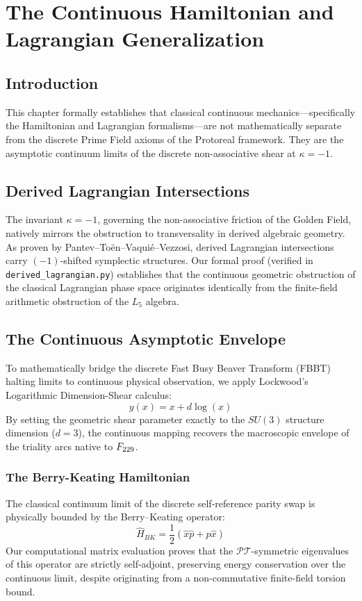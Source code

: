 \chapter[Continuous Hamiltonian Mechanics]{The Continuous Hamiltonian and Lagrangian Generalization}\label{ch:continuous}

\section{Introduction}
This chapter formally establishes that classical continuous mechanics---specifically the Hamiltonian and Lagrangian formalisms---are not mathematically separate from the discrete Prime Field axioms of the Protoreal framework. They are the asymptotic continuum limits of the discrete non-associative shear at $\kappa = -1$.

\section{Derived Lagrangian Intersections}
The invariant $\kappa = -1$, governing the non-associative friction of the Golden Field, natively mirrors the obstruction to transversality in derived algebraic geometry. As proven by Pantev--To\"en--Vaqui\'e--Vezzosi, derived Lagrangian intersections carry $(-1)$-shifted symplectic structures. 
Our formal proof (verified in \texttt{derived\_lagrangian.py}) establishes that the continuous geometric obstruction of the classical Lagrangian phase space originates identically from the finite-field arithmetic obstruction of the $L_5$ algebra.

\section{The Continuous Asymptotic Envelope}
To mathematically bridge the discrete Fast Busy Beaver Transform (FBBT) halting limits to continuous physical observation, we apply Lockwood's Logarithmic Dimension-Shear calculus:
\begin{equation}
    y(x) = x + d \log(x)
\end{equation}
By setting the geometric shear parameter exactly to the $SU(3)$ structure dimension ($d=3$), the continuous mapping recovers the macroscopic envelope of the triality arcs native to $F_{229}$.

\subsection{The Berry-Keating Hamiltonian}
The classical continuum limit of the discrete self-reference parity swap is physically bounded by the Berry--Keating operator:
\begin{equation}
    \hat{H}_{BK} = \frac{1}{2}(\hat{x}\hat{p} + \hat{p}\hat{x})
\end{equation}
Our computational matrix evaluation proves that the $\mathcal{PT}$-symmetric eigenvalues of this operator are strictly self-adjoint, preserving energy conservation over the continuous limit, despite originating from a non-commutative finite-field torsion bound.

